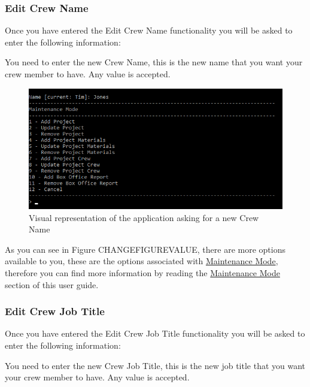 \documentclass[
  english,
  a4paper,
,tablecaptionabove
]{scrartcl}
\begin{document}
\hypertarget{edit-crew-name-3}{%
\subsubsection{Edit Crew Name}\label{edit-crew-name-3}}

Once you have entered the Edit Crew Name functionality you will be asked
to enter the following information:

You need to enter the new Crew Name, this is the new name that you want
your crew member to have. Any value is accepted.

\begin{figure}
\centering
\includegraphics{images/user-guide/maintenance-mode/update-crew-name.png}
\caption{Visual representation of the application asking for a new Crew
Name}
\end{figure}

As you can see in Figure CHANGEFIGUREVALUE, there are more options
available to you, these are the options associated with
\protect\hyperlink{using-maintenance-mode}{Maintenance Mode}, therefore
you can find more information by reading the
\protect\hyperlink{using-maintenance-mode}{Maintenance Mode} section of
this user guide.

\newpage

\hypertarget{edit-crew-job-title-3}{%
\subsubsection{Edit Crew Job Title}\label{edit-crew-job-title-3}}

Once you have entered the Edit Crew Job Title functionality you will be
asked to enter the following information:

You need to enter the new Crew Job Title, this is the new job title that
you want your crew member to have. Any value is accepted.
\end{document}
